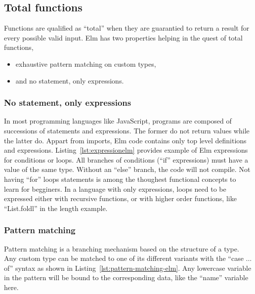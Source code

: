 


\subsection{Total functions}%
\label{sub:total_functions}

Functions are qualified as ``total'' when they are guarantied
to return a result for every possible valid input.
Elm has two properties helping in the quest of total functions,
\begin{itemize}
	\item exhaustive pattern matching on custom types,
	\item and no statement, only expressions.
\end{itemize}

\subsubsection{No statement, only expressions}%
\label{ssub:no_statement_only_expressions}

In most programming languages like JavaScript,
programs are composed of successions of statements and expressions.
The former do not return values while the latter do.
Appart from imports, Elm code contains only top level definitions and expressions.
Listing~\ref{lst:expressionelm} provides example of Elm expressions
for conditions or loops.
All branches of conditions (``if'' expressions) must have a value of the same type.
Without an ``else'' branch, the code will not compile.
Not having ``for'' loops statements is among the thoughest functional
concepts to learn for begginers.
In a language with only expressions,
loops need to be expressed either with recursive functions,
or with higher order functions, like ``List.foldl'' in the length example.




\subsubsection{Pattern matching}%
\label{ssub:pattern_matching}

Pattern matching is a branching mechanism based on the structure of a type.
Any custom type can be matched to one of its different variants
with the ``case ... of'' syntax as shown in Listing~\ref{lst:pattern-matching-elm}.
Any lowercase variable in the pattern will be bound to the corresponding data,
like the ``name'' variable here.

